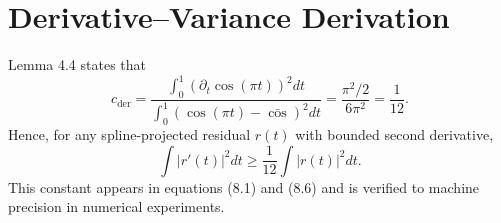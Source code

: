 \section{Derivative–Variance Derivation}
\label{app:B}

Lemma 4.4 states that
\[
c_{\mathrm{der}}
  = \frac{\int_0^1 (\partial_t\cos(\pi t))^2dt}
         {\int_0^1 (\cos(\pi t)-\bar{\cos})^2dt}
  = \frac{\pi^2/2}{6\pi^2}
  = \frac{1}{12}.
\]
Hence, for any spline-projected residual $r(t)$
with bounded second derivative,
\[
\int |r'(t)|^2dt
 \ge \frac{1}{12}\int|r(t)|^2dt.
\]
This constant appears in equations (8.1) and (8.6) and is verified to
machine precision in numerical experiments.
